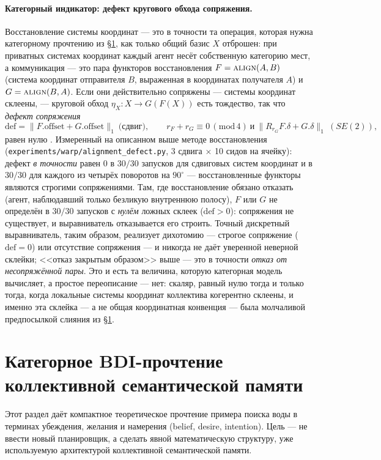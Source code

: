 \documentclass{article}
\begin{document}
\paragraph{Категорный индикатор: дефект кругового обхода сопряжения.}
Восстановление системы координат --- это в точности та операция,
которая нужна категорному прочтению из \S\ref{sec:categorical}, как
только общий базис $X$ отброшен: при приватных системах координат
каждый агент несёт собственную категорию мест, а коммуникация --- это
пара функторов восстановления $F=\textsc{align}(A,B)$ (система
координат отправителя $B$, выраженная в координатах получателя $A$) и
$G=\textsc{align}(B,A)$. Если они действительно сопряжены --- системы
координат склеены, --- круговой обход $\eta_X: X\to G(F(X))$ есть
тождество, так что \emph{дефект сопряжения}
\[
\mathrm{def}=\lVert F.\mathrm{offset}+G.\mathrm{offset}\rVert_1
\ \text{(сдвиг)},\qquad
r_F{+}r_G\equiv 0\,(\mathrm{mod}\,4)\ \text{и}\
\lVert R_{r_G}F.\delta+G.\delta\rVert_1\ (SE(2)),
\]
равен нулю \citep{maclane1998categories}. Измеренный на описанном выше
методе восстановления (\texttt{experiments/warp/alignment\_defect.py},
3 сдвига $\times$ 10 сидов на ячейку): дефект \emph{в точности} равен
$0$ в $30/30$ запусков для сдвиговых систем координат и в $30/30$ для
каждого из четырёх поворотов на $90^\circ$ --- восстановленные функторы
являются строгими сопряжениями. Там, где восстановление обязано
отказать (агент, наблюдавший только безликую внутреннюю полосу), $F$
или $G$ не определён в $30/30$ запусков с \emph{нулём} ложных склеек
($\mathrm{def}>0$): сопряжения не существует, и выравниватель
отказывается его строить. Точный дискретный выравниватель, таким
образом, реализует дихотомию --- строгое сопряжение
($\mathrm{def}{=}0$) или отсутствие сопряжения --- и никогда не даёт
уверенной неверной склейки; <<отказ закрытым образом>> выше --- это в
точности \emph{отказ от несопряжённой пары}. Это и есть та величина,
которую категорная модель вычисляет, а простое переописание --- нет:
скаляр, равный нулю тогда и только тогда, когда локальные системы
координат коллектива когерентно склеены, и именно эта склейка --- а не
общая координатная конвенция --- была молчаливой предпосылкой слияния
из \S\ref{sec:categorical}.

\section{Категорное BDI-прочтение коллективной семантической памяти}
\label{sec:categorical}

Этот раздел даёт компактное теоретическое прочтение примера поиска
воды в терминах убеждения, желания и намерения (belief, desire,
intention). Цель --- не ввести новый планировщик, а сделать явной
математическую структуру, уже используемую архитектурой коллективной
семантической памяти.
\end{document}
